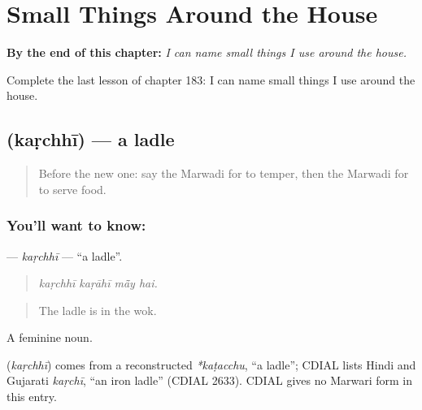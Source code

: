 
\chapter{Small Things Around the House}
\label{ch:mw-small-things-around-the-house}

\begin{chapteropening}
\textbf{By the end of this chapter:} \emph{I can name small things I use around the house.}

Complete the last lesson of chapter 183: I can name small things I use around the house.
\end{chapteropening}

\section[\texorpdfstring{\mw{कड़छी} (kaṛchhī)}{कड़छी (kaṛchhī)}]{ (kaṛchhī) — a ladle}

\label{lesson:MW-C183-karchhi}



\begin{quote}
Before the new one: say the Marwadi for to temper, then the Marwadi for to serve food.
\end{quote}

\subsection*{You'll want to know: }
\textbf{} — \emph{kaṛchhī} — \textquotedblleft{}a ladle\textquotedblright{}.

\begin{quote}
   
\end{quote}

\begin{quote}
\emph{kaṛchhī kaṛāhī mā̃y hai.}
\end{quote}

\begin{quote}
The ladle is in the wok.
\end{quote}

A feminine noun.

\begin{cousinweb}
\textbf{} (\emph{kaṛchhī}) comes from a reconstructed \emph{*kaṭacchu}, \textquotedblleft{}a ladle\textquotedblright{}; CDIAL lists Hindi and Gujarati \emph{kaṛchī}, \textquotedblleft{}an iron ladle\textquotedblright{} (CDIAL 2633). CDIAL gives no Marwari form in this entry.
\end{cousinweb}

